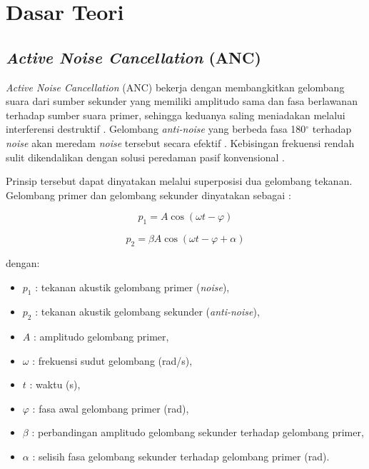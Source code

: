 \section{Dasar Teori}
\label{sec:dasar_teori}

\subsection{\emph{Active Noise Cancellation} (ANC)}
\label{sec:anc}

\emph{Active Noise Cancellation} (ANC) bekerja dengan membangkitkan gelombang suara dari sumber sekunder yang memiliki amplitudo sama dan fasa berlawanan terhadap sumber suara primer, sehingga keduanya saling meniadakan melalui interferensi destruktif \parencite{zhangrs2023}. Gelombang \emph{anti-noise} yang berbeda fasa 180$^\circ$ terhadap \emph{noise} akan meredam \emph{noise} tersebut secara efektif \parencite{shi2023anc}. Kebisingan frekuensi rendah sulit dikendalikan dengan solusi peredaman pasif konvensional \parencite{shi2023anc,chen2025}.

Prinsip tersebut dapat dinyatakan melalui superposisi dua gelombang tekanan. Gelombang primer dan gelombang sekunder dinyatakan sebagai \parencite{zhangrs2023}:

\begin{equation}
  \label{eq:2_p1}
  p_1 = A\cos(\omega t - \varphi)
\end{equation}

\begin{equation}
  \label{eq:2_p2}
  p_2 = \beta A\cos(\omega t - \varphi + \alpha)
\end{equation}

dengan:
\begin{itemize}[noitemsep, topsep=2pt]
  \item $p_1$ : tekanan akustik gelombang primer (\emph{noise}),
  \item $p_2$ : tekanan akustik gelombang sekunder (\emph{anti-noise}),
  \item $A$ : amplitudo gelombang primer,
  \item $\omega$ : frekuensi sudut gelombang (rad/s),
  \item $t$ : waktu (s),
  \item $\varphi$ : fasa awal gelombang primer (rad),
  \item $\beta$ : perbandingan amplitudo gelombang sekunder terhadap gelombang primer,
  \item $\alpha$ : selisih fasa gelombang sekunder terhadap gelombang primer (rad).
\end{itemize}

